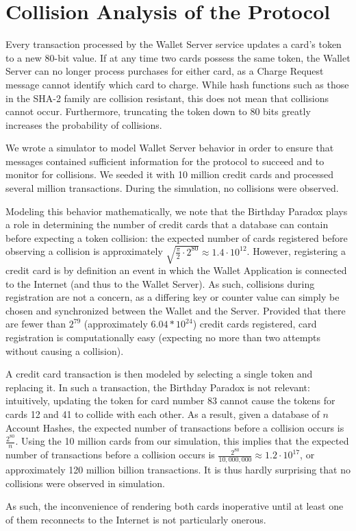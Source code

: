 \section{Collision Analysis of the Protocol}
\label{sec:collisions_and_simulations}

Every transaction processed by the Wallet Server service updates a card's token  to a new 80-bit value.
If at any time two cards possess the same token, the Wallet Server can no longer process purchases for either card,
    as a Charge Request message cannot identify which card to charge.
While hash functions such as those in the SHA-2 family are collision resistant, this does not mean that collisions cannot occur.
Furthermore, truncating the token down to 80 bits greatly increases the probability of collisions.

We wrote a simulator to model Wallet Server behavior in order to ensure that messages contained sufficient information for the protocol to succeed
    and to monitor for collisions.
We seeded it with 10 million credit cards and processed several million transactions.
During the simulation, no collisions were observed.

Modeling this behavior mathematically, we note that the Birthday Paradox plays a role in determining the number of credit cards that a database can contain before expecting a token collision:
the expected number of cards registered before observing a collision is approximately
$\sqrt{\frac{\pi}{2} \cdot 2^{80}} \approx 1.4 \cdot 10^{12}$.
However, registering a credit card is by definition an event in which the Wallet Application is connected to the Internet (and thus to the Wallet Server).
As such, collisions during registration are not a concern, as a differing key  or counter value can simply be chosen and synchronized between the Wallet and the Server.
Provided that there are fewer than $2^{79}$ (approximately $6.04 * 10^{24}$) credit cards registered,
    card registration is computationally easy (expecting no more than two attempts without causing a collision).

A credit card transaction is then modeled by selecting a single token and replacing it.
In such a transaction, the Birthday Paradox is not relevant:
intuitively, updating the token for card number 83 cannot cause the tokens for cards 12 and 41 to collide with each other.
As a result, given a database of $n$ Account Hashes, the expected number of transactions before a collision occurs is
$\frac{2^{80}}{n}$.
Using the 10 million cards from our simulation, this implies that the expected number of transactions before a collision occurs is
$\frac{2^{80}}{10,000,000} \approx 1.2 \cdot 10 ^ {17}$, or approximately 120 million billion transactions.
It is thus hardly surprising that no collisions were observed in simulation.

As such, the inconvenience of rendering both cards inoperative until at least one of them reconnects to the Internet is not particularly onerous.